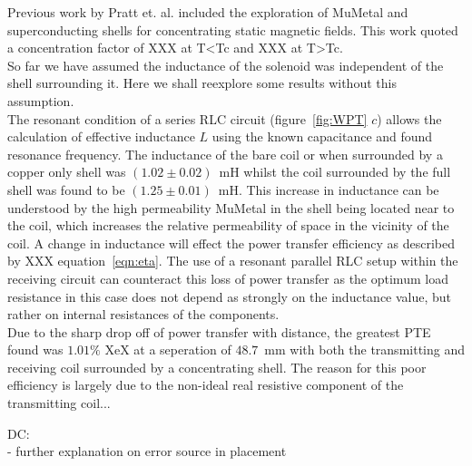 \documentclass[11pt]{iopart}
\begin{document}
Previous work by Pratt et. al.\cite{} included the exploration of
MuMetal and superconducting shells for concentrating static magnetic
fields. This work quoted a concentration factor of XXX at T<Tc and XXX
at T>Tc.\\
So far we have assumed the inductance of the solenoid
was independent of the shell surrounding it. Here we shall reexplore
some results without this assumption. \\ The resonant condition of a
series RLC circuit (figure~\ref{fig:WPT} $c$)
allows the calculation of effective inductance $L$ using the known
capacitance and found resonance frequency.  The inductance of the bare
coil or when surrounded by a copper only shell was $(1.02\pm0.02)$~mH
whilst the coil surrounded by the full shell was found to be
$(1.25\pm0.01)$~mH.  This increase in inductance can be understood by
the high permeability MuMetal in the shell being located near to the
coil, which increases the relative permeability of space in the
vicinity of the coil. A change in inductance will effect the power
transfer efficiency as described by XXX equation~\ref{eqn:eta}.  The
use of a resonant parallel RLC setup within the receiving circuit can
counteract this loss of power transfer as the optimum load resistance
in this case does not depend as strongly on the inductance value, but
rather on internal resistances of the components.\\

Due to the sharp drop off of power transfer with distance, the
greatest PTE found was $1.01\%$ XeX at a seperation of $48.7$~mm with
both the transmitting and receiving coil surrounded by a concentrating
shell. The reason for this poor efficiency is largely due to the
non-ideal real resistive component of the transmitting coil...


DC:  \\
- further explanation on error source in placement \\
\end{document}
